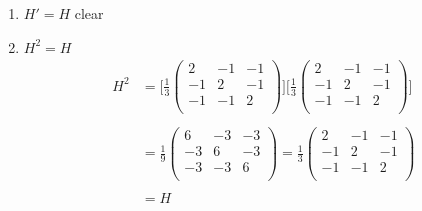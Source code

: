 \documentclass[11pt,a4paper]{article}
\theoremstyle{definition}
\begin{document}
\pagebreak
\begin{enumerate}
\item $H'=H$ clear

\item $H^2 = H$
\begin{align*}
H^2 & = \Bigg[\frac{1}{3}\begin{pmatrix}
2 & -1 & -1\\
-1 & 2 & -1\\
-1 & -1 & 2\\
\end{pmatrix}\Bigg]\Bigg[\frac{1}{3}\begin{pmatrix}
2 & -1 & -1\\
-1 & 2 & -1\\
-1 & -1 & 2\\
\end{pmatrix}\Bigg]\\\\
& = \frac{1}{9}\begin{pmatrix}
6 & -3 & -3 \\
-3 & 6 & -3\\
-3 & -3 & 6\\
\end{pmatrix}= \frac{1}{3}\begin{pmatrix}
2 & -1 & -1\\
-1 & 2 & -1\\
-1 & -1 & 2\\
\end{pmatrix}\\\\
& = H\\
\end{align*}




\end{enumerate}
\end{document}

